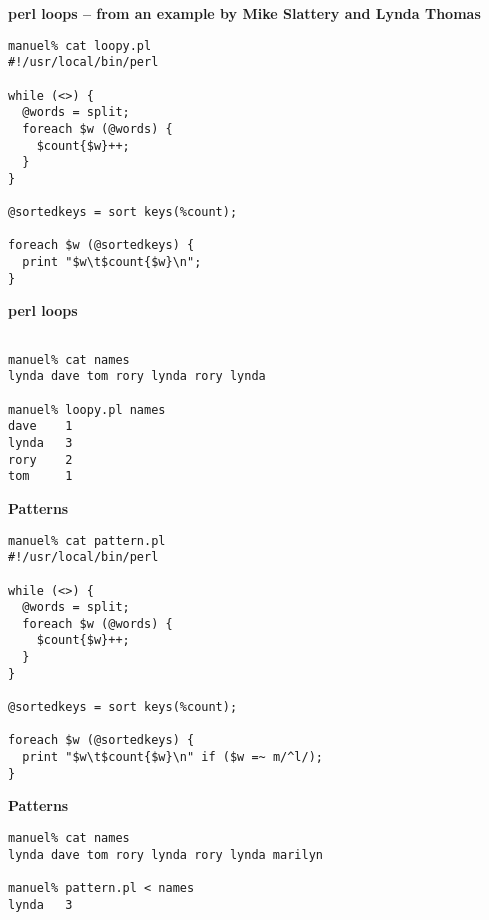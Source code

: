 %
%
\begin{slide}{}
{\bf perl loops -- from an example by Mike Slattery and Lynda Thomas}

\begin{verbatim}
manuel% cat loopy.pl
#!/usr/local/bin/perl

while (<>) {
  @words = split;
  foreach $w (@words) {
    $count{$w}++;
  }
}

@sortedkeys = sort keys(%count);

foreach $w (@sortedkeys) {
  print "$w\t$count{$w}\n";
}

\end{verbatim}

\end{slide}

%
%
\begin{slide}{}
{\bf perl loops}

\begin{verbatim}

manuel% cat names
lynda dave tom rory lynda rory lynda

manuel% loopy.pl names
dave    1
lynda   3
rory    2
tom     1

\end{verbatim}
\end{slide}

%
%
\begin{slide}{}
{\bf Patterns}
\begin{verbatim}
manuel% cat pattern.pl
#!/usr/local/bin/perl

while (<>) {
  @words = split;
  foreach $w (@words) {
    $count{$w}++;
  }
}

@sortedkeys = sort keys(%count);

foreach $w (@sortedkeys) {
  print "$w\t$count{$w}\n" if ($w =~ m/^l/);
}
\end{verbatim}
\end{slide}

%
%
\begin{slide}{}
{\bf Patterns}
\begin{verbatim}
manuel% cat names 
lynda dave tom rory lynda rory lynda marilyn

manuel% pattern.pl < names
lynda   3

\end{verbatim}
\end{slide}

